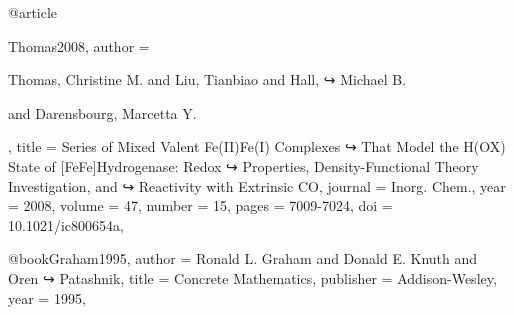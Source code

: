\documentclass{article}
\begin{document}
@article{Thomas2008,
author = {Thomas, Christine M. and Liu, Tianbiao and Hall,
↪ Michael B.

and Darensbourg, Marcetta Y.},
title = {Series of Mixed Valent {Fe(II)Fe(I)} Complexes
↪ That Model the
{H(OX)} State of [{FeFe}]Hydrogenase: Redox
↪ Properties,
Density-Functional Theory Investigation, and
↪ Reactivity with
Extrinsic {CO}},
journal = {Inorg. Chem.},
year = {2008},
volume = {47},
number = {15},
pages = {7009-7024},
doi = {10.1021/ic800654a},
}
@book{Graham1995,
author = {Ronald L. Graham and Donald E. Knuth and Oren
↪ Patashnik},
title = {Concrete Mathematics},
publisher = {Addison-Wesley},
year = {1995},
}
\end{document}
